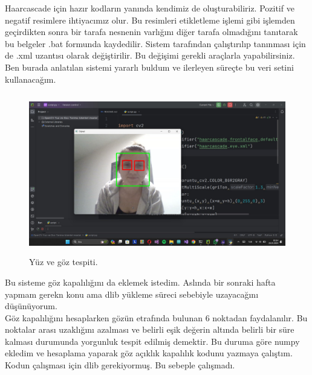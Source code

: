 \documentclass[12pt, a4paper]{article}
\begin{document}
 Haarcascade için hazır kodların yanında kendimiz de oluşturabiliriz. Pozitif ve negatif resimlere ihtiyacımız olur. Bu resimleri etikletleme işlemi gibi işlemden geçirdikten sonra bir tarafa nesnenin varlığını diğer tarafa olmadığını tanıtarak bu belgeler .bat formunda kaydedilir. Sistem tarafından çalıştırılıp tanınması için de .xml uzantısı olarak değiştirilir. Bu değişimi gerekli araçlarla yapabilirsiniz. Ben \cite{dasar_haartrain} burada anlatılan sistemi yararlı buldum ve ilerleyen süreçte bu veri setini kullanacağım.\clearpage
 \begin{figure}
 	\centering
 	\includegraphics[width=17cm, height=7cm, keepaspectratio]{yuzgoztanima.jpg}
 	\caption{Yüz ve göz tespiti.} 
 \end{figure}
 \par
 Bu sisteme göz kapalılığını da eklemek istedim. Aslında bir sonraki hafta yapmam gerekn konu ama dlib yükleme süreci sebebiyle uzayacağını düşünüyorum. \\ Göz kapalılığını hesaplarken gözün etrafında bulunan 6 noktadan faydalanılır. Bu noktalar arası uzaklığını azalması ve belirli eşik değerin altında belirli bir süre kalması durumunda yorgunluk tespit edilmiş demektir. Bu duruma göre numpy ekledim ve hesaplama yaparak göz açıklık kapalılık kodunu yazmaya çalıştım. Kodun çalışması için dlib gerekiyormuş. Bu sebeple çalışmadı.
\end{document}
